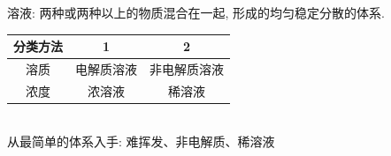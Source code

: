 \documentclass[12pt, a4paper, oneside]{ctexbook}
\begin{document}
溶液: 两种或两种以上的物质混合在一起, 形成的均匀稳定分散的体系. 
\begin{table}[htbp]
    \centering
    \begin{tabular}{|c|c|c|}
        \hline
         分类方法 & 1 & 2\\
        \hline
        溶质 & 电解质溶液 & 非电解质溶液\\
        \hline
        浓度 & 浓溶液 & 稀溶液\\
        \hline
    \end{tabular}
\end{table}
\\从最简单的体系入手: 难挥发、非电解质、稀溶液
\end{document}
